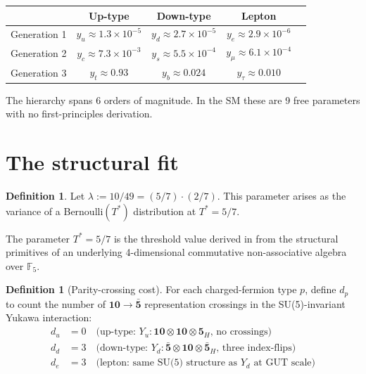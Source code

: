 \documentclass[11pt,reqno]{amsart}
\theoremstyle{plain}
\theoremstyle{definition}
\newtheorem{definition}[theorem]{Definition}
\theoremstyle{remark}
\newcommand{\F}{\mathbb{F}}
\begin{document}
\begin{center}
\begin{tabular}{lcc c c}
\toprule
& Up-type & Down-type & Lepton \\
\midrule
Generation 1 & $y_u \approx 1.3 \times 10^{-5}$ & $y_d \approx 2.7 \times 10^{-5}$ & $y_e \approx 2.9 \times 10^{-6}$ \\
Generation 2 & $y_c \approx 7.3 \times 10^{-3}$ & $y_s \approx 5.5 \times 10^{-4}$ & $y_\mu \approx 6.1 \times 10^{-4}$ \\
Generation 3 & $y_t \approx 0.93$ & $y_b \approx 0.024$ & $y_\tau \approx 0.010$ \\
\bottomrule
\end{tabular}
\end{center}

The hierarchy spans 6 orders of magnitude. In the SM these are 9 free
parameters with no first-principles derivation.

\section{The structural fit}

\begin{definition}
Let $\lambda := 10/49 = (5/7) \cdot (2/7)$. This parameter arises as the
variance of a Bernoulli$(T^*)$ distribution at $T^* = 5/7$.
\end{definition}

The parameter $T^* = 5/7$ is the threshold value derived in
\cite{Sanders2026Dirac} from the structural primitives of an underlying
4-dimensional commutative non-associative algebra over $\F_5$.

\begin{definition}[Parity-crossing cost]
For each charged-fermion type $p$, define $d_p$ to count the number of
$\mathbf{10} \to \bar{\mathbf{5}}$ representation crossings in the
SU(5)-invariant Yukawa interaction:
\begin{align*}
d_u &= 0 \quad \text{(up-type: $Y_u : \mathbf{10} \otimes \mathbf{10}
\otimes \mathbf{5}_H$, no crossings)} \\
d_d &= 3 \quad \text{(down-type: $Y_d : \bar{\mathbf{5}} \otimes
\mathbf{10} \otimes \bar{\mathbf{5}}_H$, three index-flips)} \\
d_e &= 3 \quad \text{(lepton: same SU(5) structure as $Y_d$ at GUT scale)}
\end{align*}
\end{definition}
\end{document}
